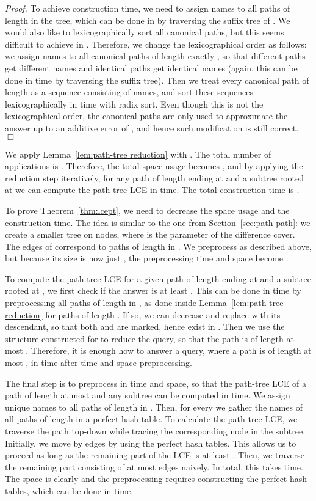 \documentclass [10pt]{article}
\newcommand{\qed}{\hfill\ensuremath{\Box}\medskip\\\noindent}
\newenvironment{proof}{\noindent\emph{Proof. }}{}
\begin{document}
\begin{proof}
To achieve  construction time, we need to assign names to all paths of length  in the tree, which can be done in
 by traversing the suffix tree of . We would also like to lexicographically sort all canonical paths, but this seems
difficult to achieve in . Therefore, we change the lexicographical order as follows: we assign names to all canonical
paths of length exactly , so that different paths get different names and identical paths get identical names
(again, this can be done in  time by traversing the suffix tree). Then we treat every canonical path of length 
as a sequence consisting of  names, and sort these sequences lexicographically in  time with radix sort.
Even though this is not the lexicographical order, the canonical paths are only used to approximate the answer up to an additive
error of , and hence such modification is still correct.
\qed
\end{proof}

We apply Lemma~\ref{lem:path-tree reduction} with . The total number of applications is
. Therefore, the total space usage becomes , and by applying the reduction step iteratively,
for any path of length  ending at  and a subtree rooted at  we can compute the path-tree LCE in  time.
The total construction time is .

To prove Theorem~\ref{thm:lcept}, we need to decrease the space usage and the construction time. The idea is similar to the one
from Section~\ref{sec:path-path}: we create a smaller tree  on  nodes, where  is the parameter
of the difference cover. The edges of  correspond to paths of length  in . We preprocess  as described
above, but because its size is now just , the preprocessing time and space become .

To compute the path-tree LCE for a given path of length  ending at  and a subtree rooted at , we first check if the
answer is at least . This can be done in  time by preprocessing all paths of length  in ,
as done inside Lemma~\ref{lem:path-tree reduction} for paths of length . If so, we can decrease  and
replace  with its descendant, so that both  and  are marked, hence exist in . Then
we use the structure constructed for  to reduce the query, so that the path is of length at most . Therefore,
it is enough how to answer a query, where a path is of length at most , in  time after  time
and space preprocessing.

The final step is to preprocess  in  time and space, so that the path-tree LCE of a path of length at most 
and any subtree can be computed in  time. We assign unique names to all paths of length  in . Then, for every 
we gather the names of all paths  of length  in a perfect hash table. To calculate the path-tree LCE, we traverse
the path top-down while tracing the corresponding node in the subtree. Initially, we move by  edges by using the
perfect hash tables. This allows us to proceed as long as the remaining part of the LCE is at least . Then, we traverse the remaining
part consisting of at most  edges naively. In total, this takes  time. The space is clearly  and the preprocessing
requires constructing the perfect hash tables, which can be done in  time.
\end{document}
